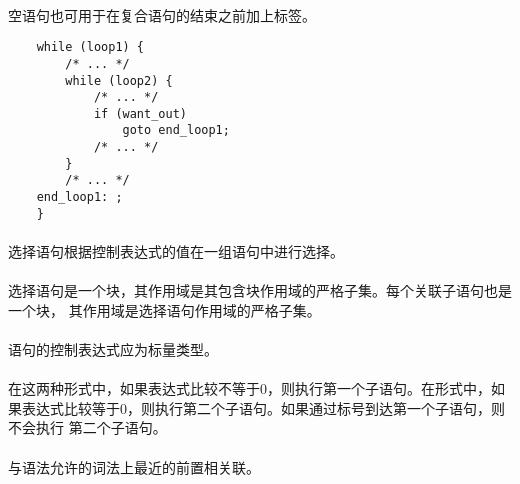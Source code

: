 {\paragraph{}
\ex 空语句也可用于在复合语句的结束\tm{\}}之前加上标签。
\begin{lstlisting}
    while (loop1) {
        /* ... */
        while (loop2) {
            /* ... */
            if (want_out)
                goto end_loop1;
            /* ... */
        }
        /* ... */
    end_loop1: ;
    }
\end{lstlisting}


\syntax
\paragraph{}

\semantic
\paragraph{}
选择语句根据控制表达式的值在一组语句中进行选择。

\paragraph{}
选择语句是一个块，其作用域是其包含块作用域的严格子集。每个关联子语句也是一个块，
其作用域是选择语句作用域的严格子集。

\constraint
\paragraph{}
语句的控制表达式应为标量类型。

\semantic
\paragraph{}
在这两种形式中，如果表达式比较不等于0，则执行第一个子语句。在形式中，如
果表达式比较等于0，则执行第二个子语句。如果通过标号到达第一个子语句，则不会执行
第二个子语句。

\paragraph{}
与语法允许的词法上最近的前置相关联。

}
